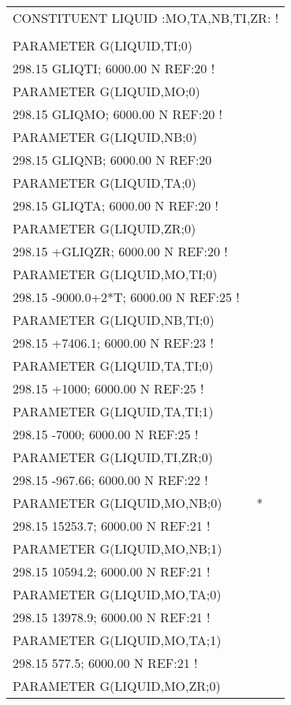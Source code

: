 \begin{longtable}[H]{ l l l }
	\multicolumn{3}{l}{CONSTITUENT LIQUID :MO,TA,NB,TI,ZR: !}\\
	& & \\
	PARAMETER G(LIQUID,TI;0) & &\\
	\multicolumn{3}{l}{298.15 GLIQTI; 6000.00 N REF:20 !}\\
	PARAMETER G(LIQUID,MO;0)& &\\
	\multicolumn{3}{l}{298.15 GLIQMO; 6000.00 N REF:20 !}\\
	PARAMETER G(LIQUID,NB;0) & & \\
	\multicolumn{3}{l}{298.15 GLIQNB; 6000.00 N REF:20 }\\
	PARAMETER G(LIQUID,TA;0) & &\\
	\multicolumn{3}{l}{298.15 GLIQTA; 6000.00 N REF:20 !}\\
	PARAMETER G(LIQUID,ZR;0) & &\\
	\multicolumn{3}{l}{298.15 +GLIQZR; 6000.00 N REF:20 !}\\
	PARAMETER G(LIQUID,MO,TI;0) & & \\
	\multicolumn{3}{l}{298.15 -9000.0+2*T; 6000.00 N REF:25 !}\\
	PARAMETER G(LIQUID,NB,TI;0) & & \\
	\multicolumn{3}{l}{298.15 +7406.1; 6000.00 N REF:23 !}\\	 
	PARAMETER G(LIQUID,TA,TI;0) & & \\
	\multicolumn{3}{l}{298.15 +1000; 6000.00 N REF:25 !}\\
	PARAMETER G(LIQUID,TA,TI;1) & & \\
	\multicolumn{3}{l}{298.15 -7000; 6000.00 N REF:25 !}\\	 
	PARAMETER G(LIQUID,TI,ZR;0) & & \\
	\multicolumn{3}{l}{298.15 -967.66; 6000.00 N REF:22 !}\\ 
	PARAMETER G(LIQUID,MO,NB;0) & *& \\
	\multicolumn{3}{l}{298.15 15253.7; 6000.00 N REF:21 !}\\
	PARAMETER G(LIQUID,MO,NB;1) & & \\
	\multicolumn{3}{l}{298.15 10594.2; 6000.00 N REF:21 !}\\	 	 
	PARAMETER G(LIQUID,MO,TA;0) & & \\
	\multicolumn{3}{l}{298.15 13978.9; 6000.00 N REF:21 !}\\
	PARAMETER G(LIQUID,MO,TA;1) & & \\
	\multicolumn{3}{l}{298.15 577.5; 6000.00 N REF:21 !}\\
	PARAMETER G(LIQUID,MO,ZR;0) & & \\

\end{longtable}

